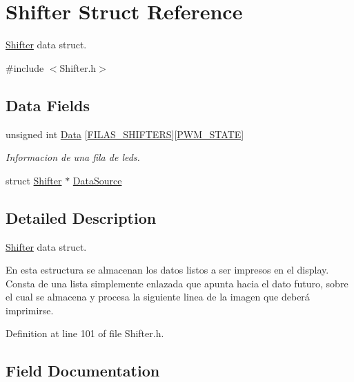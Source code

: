 \hypertarget{structShifter}{}\section{Shifter Struct Reference}
\label{structShifter}


\hyperlink{structShifter}{Shifter} data struct.  




{\ttfamily \#include $<$Shifter.\+h$>$}

\subsection*{Data Fields}
\begin{DoxyCompactItemize}
\item 
unsigned int \hyperlink{structShifter_a815b5530bcfa9d222f76fd2033f47afa}{Data} \mbox{[}\hyperlink{Shifter_8h_a49e09f75d58a782c6d7f7e2def2611ae}{F\+I\+L\+A\+S\+\_\+\+S\+H\+I\+F\+T\+E\+RS}\mbox{]}\mbox{[}\hyperlink{Shifter_8h_a980e4269a1af42f44334612038718c32}{P\+W\+M\+\_\+\+S\+T\+A\+TE}\mbox{]}
\begin{DoxyCompactList}\small\item\em Informacion de una fila de leds. \end{DoxyCompactList}\item 
struct \hyperlink{structShifter}{Shifter} $\ast$ \hyperlink{structShifter_a7c2c0de3d2c63e31863ed44845d63ba8}{Data\+Source}
\end{DoxyCompactItemize}


\subsection{Detailed Description}
\hyperlink{structShifter}{Shifter} data struct. 

En esta estructura se almacenan los datos listos a ser impresos en el display. Consta de una lista simplemente enlazada que apunta hacia el dato futuro, sobre el cual se almacena y procesa la siguiente linea de la imagen que deberá imprimirse. 

Definition at line 101 of file Shifter.\+h.



\subsection{Field Documentation}
\mbox{\label{structShifter_a815b5530bcfa9d222f76fd2033f47afa}} 
